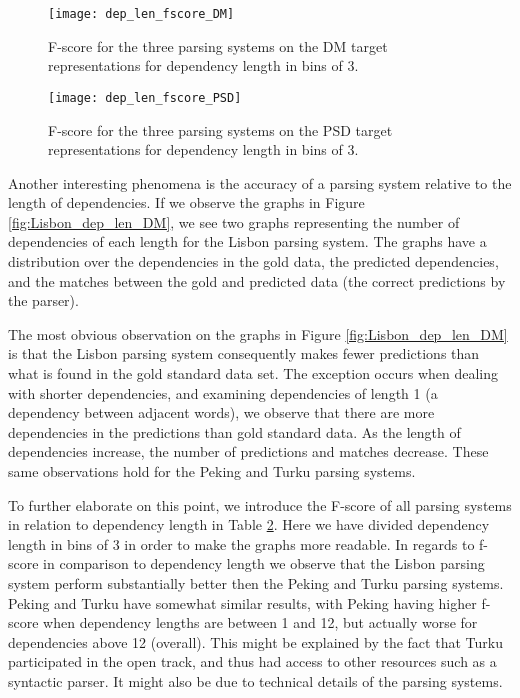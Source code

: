 \begin{figure}[h]
    \centering
    \begin{minipage}{0.8\textwidth}
        \centering
        \texttt{[image: dep\_len\_fscore\_DM]}
    \end{minipage}\hfill
    \caption{F-score for the three parsing systems on the DM target representations for dependency length in bins of 3.}
    \label{fig:dep_len_fscore}
\end{figure}

\begin{figure}[h]
    \centering
    \begin{minipage}{0.8\textwidth}
        \centering
        \texttt{[image: dep\_len\_fscore\_PSD]}
    \end{minipage}
    \caption{F-score for the three parsing systems on the PSD target representations for dependency length in bins of 3.}
    \label{fig:dep_len_fscore}
\end{figure}

Another interesting phenomena is the accuracy of a parsing system relative to the length of dependencies. If we observe the graphs in Figure \ref{fig:Lisbon_dep_len_DM}, we see two graphs representing the number of dependencies of each length for the Lisbon parsing system. The graphs have a distribution over the dependencies in the gold data, the predicted dependencies, and the matches between the gold and predicted data (the correct predictions by the parser).

The most obvious observation on the graphs in Figure \ref{fig:Lisbon_dep_len_DM} is that the Lisbon parsing system consequently makes fewer predictions than what is found in the gold standard data set. The exception occurs when dealing with shorter dependencies, and examining dependencies of length 1 (a dependency between adjacent words), we observe that there are more dependencies in the predictions than gold standard data. As the length of dependencies increase, the number of predictions and matches decrease. These same observations hold for the Peking and Turku parsing systems.

To further elaborate on this point, we introduce the F-score of all parsing systems in relation to dependency length in Table \ref{fig:dep_len_fscore}. Here we have divided dependency length in bins of 3 in order to make the graphs more readable. In regards to f-score in comparison to dependency length we observe that the Lisbon parsing system perform substantially better then the Peking and Turku parsing systems. Peking and Turku have somewhat similar results, with Peking having higher f-score when dependency lengths are between 1 and 12, but actually worse for dependencies above 12 (overall). This might be explained by the fact that Turku participated in the open track, and thus had access to other resources such as a syntactic parser. It might also be due to technical details of the parsing systems.

